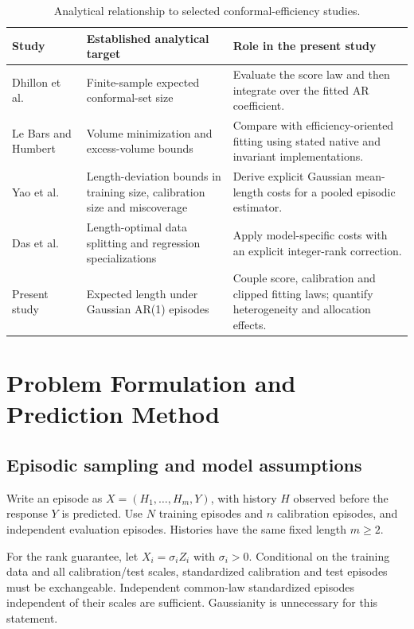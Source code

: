 \documentclass[nolineno]{ieeeaccess}
\begin{document}
\begin{table}[t]
\centering\small
\caption{Analytical relationship to selected conformal-efficiency studies.}
\label{tab:literature}
\renewcommand{\arraystretch}{1.15}
\begin{tabular}{p{}p{}p{}}
\toprule
Study & Established analytical target & Role in the present study \\
\midrule
Dhillon et al.~\cite{dhillon2024} & Finite-sample expected conformal-set size & Evaluate the score law and then integrate over the fitted AR coefficient. \\
Le Bars and Humbert~\cite{bars2025} & Volume minimization and excess-volume bounds & Compare with efficiency-oriented fitting using stated native and invariant implementations. \\
Yao et al.~\cite{yao2026} & Length-deviation bounds in training size, calibration size and miscoverage & Derive explicit Gaussian mean-length costs for a pooled episodic estimator. \\
Das et al.~\cite{das2026} & Length-optimal data splitting and regression specializations & Apply model-specific costs with an explicit integer-rank correction. \\
Present study & Expected length under Gaussian AR(1) episodes & Couple score, calibration and clipped fitting laws; quantify heterogeneity and allocation effects. \\
\bottomrule
\end{tabular}
\end{table}

\section{Problem Formulation and Prediction Method}
\subsection{Episodic sampling and model assumptions}
Write an episode as $X=(H_1,\ldots,H_m,Y)$, with history $H$ observed before the response $Y$ is predicted. Use $N$ training episodes and $n$ calibration episodes, and independent evaluation episodes. Histories have the same fixed length $m\geq2$.

For the rank guarantee, let $X_i=\sigma_i Z_i$ with $\sigma_i>0$. Conditional on the training data and all calibration/test scales, standardized calibration and test episodes must be exchangeable. Independent common-law standardized episodes independent of their scales are sufficient. Gaussianity is unnecessary for this statement.
\end{document}
